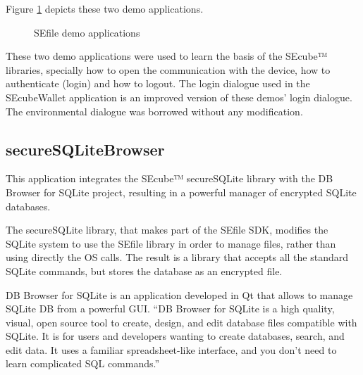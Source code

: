 Figure \ref{fig:sefiledem} depicts these two demo applications.

\begin{figure}[ht]
  \centering
  {}
  \caption{SEfile demo applications}
 \label{fig:sefiledem}
\end{figure}

These two demo applications were used to learn the basis of the SEcube™ libraries, specially how to open the communication with the device, how to authenticate (login) and how to logout. The login dialogue used in the SEcubeWallet application is an improved version of these demos' login dialogue. The environmental dialogue was borrowed without any modification.

\subsection{secureSQLiteBrowser}

This application integrates the SEcube™ secureSQLite library with the DB Browser for SQLite \cite{SQLitebro} project, resulting in a powerful manager of encrypted SQLite databases.

The secureSQLite library, that makes part of the SEfile SDK, modifies the SQLite system to use the SEfile library in order to manage files, rather than using directly the OS calls. The result is a library that accepts all the standard SQLite commands, but stores the database as an encrypted file.

DB Browser for SQLite is an application developed in Qt that allows to manage SQLite DB from a powerful GUI. ``DB Browser for SQLite is a high quality, visual, open source tool to create, design, and edit database files compatible with SQLite. It is for users and developers wanting to create databases, search, and edit data. It uses a familiar spreadsheet-like interface, and you don't need to learn complicated SQL commands.'' \cite{SQLitebro}

